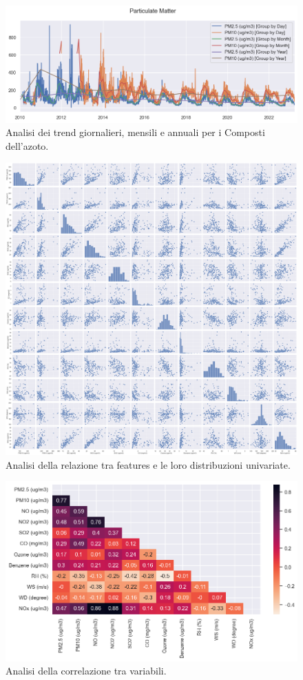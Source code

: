 \documentclass[a4paper,12pt]{report}
\begin{document}
	\begin{figure}[H]
		\centering
		\includegraphics[width=1.0\textwidth]{img/pm_trend_pm.png}
		\caption{Analisi dei trend giornalieri, mensili e annuali per i Composti dell'azoto.}
	\end{figure}
	\begin{figure}[H]
		\centering
		\includegraphics[width=1.0\textwidth]{img/corr_pairplot_pm.png}
		\caption{Analisi della relazione tra features e le loro distribuzioni univariate.}
	\end{figure}
	\begin{figure}[H]
		\centering
		\includegraphics[width=1.0\textwidth]{img/corr_pm.png}
		\caption{Analisi della correlazione tra variabili.}
	\end{figure}
	
\end{document}
